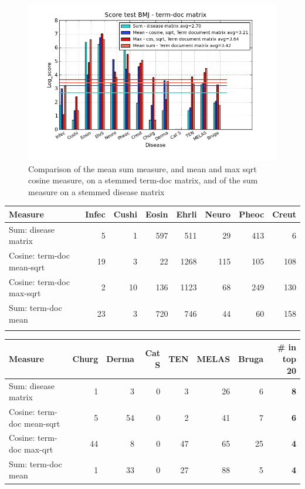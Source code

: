 \begin{figure}[H]
  \caption{Comparison of the mean sum measure, and mean and max sqrt cosine measure, on a stemmed term-doc matrix, and of the sum measure on a stemmed disease matrix}
  \begin{center}
    \includegraphics[width=1.2\textwidth]{barcharts/termDoc_bmj_hist_3000_sum_dm_mea_cos_sqrt_td_max_cos_sqrt_td_mea_sum_td.png}
  \end{center}
  \label{termDoc_bmj_hist_3000_sum_dm_mea_cos_sqrt_td_max_cos_sqrt_td_mea_sum_td}
\end{figure}

\begin{table}[H]
  \begin{tiny}
    \label{testResult_termDoc_bmj_hist_3000_sum_dm_mea_cos_sqrt_td_max_cos_sqrt_td_mea_sum_td}
    \begin{tabular}{|l|r|r|r|r|r|r|r|}
      \hline
      Measure &Infec&Cushi&Eosin&Ehrli&Neuro&Pheoc&Creut \\
      \hline
      Sum: disease matrix &5&1&597&511&29&413&6 \\
      \hline
      Cosine: term-doc mean-sqrt &19&3&22&1268&115&105&108 \\
      \hline
      Cosine: term-doc max-sqrt &2&10&136&1123&68&249&130 \\
      \hline
      Sum: term-doc mean &23&3&720&746&44&60&158 \\
      \hline
      \multicolumn{8}{c}{} \\
    \end{tabular}
    \begin{tabular}{|l|r|r|r|r|r|r|r|}
      \hline
      Measure &Churg&Derma&Cat S&TEN&MELAS&Bruga& \scriptsize{\textbf{\# in top 20}} \\
      \hline
      Sum: disease matrix &1&3&0&3&26&6 &\scriptsize{\textbf{8}} \\
      \hline
      Cosine: term-doc mean-sqrt &5&54&0&2&41&7 &\scriptsize{\textbf{6}}\\
      \hline
      Cosine: term-doc max-qrt &44&8&0&47&65&25 & \scriptsize{\textbf{4}} \\
      \hline
      Sum: term-doc mean &1&33&0&27&88&5 & \scriptsize{\textbf{4}} \\
      \hline
    \end{tabular}
  \end{tiny}
\end{table}

